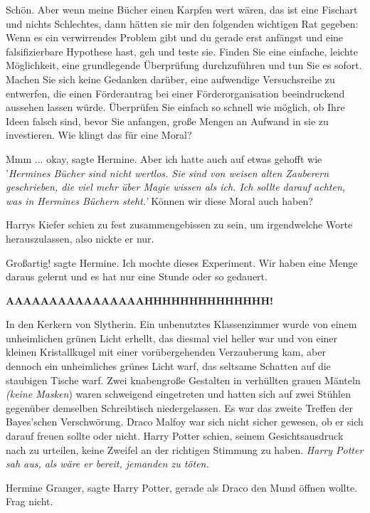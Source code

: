 \glqq Schön. Aber wenn meine Bücher einen Karpfen wert wären, das ist eine
Fischart und nichts Schlechtes, dann hätten sie mir den folgenden wichtigen Rat
gegeben: Wenn es ein verwirrendes Problem gibt und du gerade erst anfängst und
eine falsifizierbare Hypothese hast, geh und teste sie. Finden Sie eine
einfache, leichte Möglichkeit, eine grundlegende Überprüfung durchzuführen und
tun Sie es sofort. Machen Sie sich keine Gedanken darüber, eine aufwendige
Versuchsreihe zu entwerfen, die einen Förderantrag bei einer Förderorganisation
beeindruckend aussehen lassen würde. Überprüfen Sie einfach so schnell wie
möglich, ob Ihre Ideen falsch sind, bevor Sie anfangen, große Mengen an Aufwand
in sie zu investieren. Wie klingt das für eine Moral?\grqq{}

\glqq Mmm ... okay\grqq{}, sagte Hermine. \glqq Aber ich hatte auch auf etwas
gehofft wie '\emph{Hermines Bücher sind nicht wertlos. Sie sind von weisen alten
Zauberern geschrieben, die viel mehr über Magie wissen als ich. Ich sollte
darauf achten, was in Hermines Büchern steht.'} Können wir diese Moral auch
haben?\grqq{}

Harrys Kiefer schien zu fest zusammengebissen zu sein, um irgendwelche Worte
herauszulassen, also nickte er nur.

\glqq Großartig!\grqq{} sagte Hermine. \glqq Ich mochte dieses Experiment. Wir
haben eine Menge daraus gelernt und es hat nur eine Stunde oder so
gedauert.\grqq{}

\textbf{\glqq AAAAAAAAAAAAAAAAHHHHHHHHHHHHHH!\grqq{} }

In den Kerkern von Slytherin. Ein unbenutztes Klassenzimmer wurde von einem
unheimlichen grünen Licht erhellt, das diesmal viel heller war und von einer
kleinen Kristallkugel mit einer vorübergehenden Verzauberung kam, aber dennoch
ein unheimliches grünes Licht warf, das seltsame Schatten auf die staubigen
Tische warf. Zwei knabengroße Gestalten in verhüllten grauen Mänteln
\emph{(keine Masken}) waren schweigend eingetreten und hatten sich auf zwei
Stühlen gegenüber demselben Schreibtisch niedergelassen. Es war das zweite
Treffen der Bayes'schen Verschwörung. Draco Malfoy war sich nicht sicher
gewesen, ob er sich darauf freuen sollte oder nicht. Harry Potter schien, seinem
Gesichtsausdruck nach zu urteilen, keine Zweifel an der richtigen Stimmung zu
haben. \emph{Harry Potter sah aus, als wäre er bereit, jemanden zu töten.}

\glqq Hermine Granger\grqq{}, sagte Harry Potter, gerade als Draco den Mund
öffnen wollte. \glqq Frag nicht.\grqq{}

